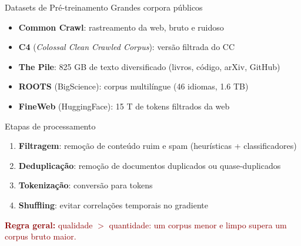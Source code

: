 \documentclass[aspectratio=169, xcolor=dvipsnames]{beamer}
\begin{document}
  \begin{frame}{Datasets de Pré-treinamento}
        Grandes corpora públicos
          \begin{itemize}
            \item \textbf{Common Crawl}: rastreamento da web, bruto e ruidoso
            \item \textbf{C4} (\textit{Colossal Clean Crawled Corpus}): versão filtrada do CC
            \item \textbf{The Pile}: 825 GB de texto diversificado (livros, código, arXiv, GitHub)
            \item \textbf{ROOTS} (BigScience): corpus multilíngue (46 idiomas, 1.6 TB)
            \item \textbf{FineWeb} (HuggingFace): 15 T de tokens filtrados da web
          \end{itemize}
        Etapas de processamento
          \begin{enumerate}
            \item \textbf{Filtragem}: remoção de conteúdo ruim e spam
              (heurísticas + classificadores)
            \item \textbf{Deduplicação}: remoção de documentos duplicados ou
              quase-duplicados
            \item \textbf{Tokenização}: conversão para tokens
            \item \textbf{Shuffling}: evitar correlações temporais no gradiente
          \end{enumerate}
        \textcolor{DarkRed}{\small \textbf{Regra geral:} qualidade $>$ quantidade: um corpus menor e limpo supera um corpus bruto maior.}
  \end{frame}
\end{document}

